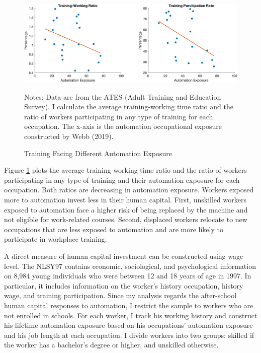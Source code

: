\documentclass[12pt]{article}
\begin{document}
\begin{figure}[h!]
\includegraphics[width = \textwidth]{train}
\caption{Training Facing Different Automation Exposure}
{\scriptsize Notes: Data are from the ATES (Adult Training and Education Survey). I calculate the average training-working time ratio and the ratio of workers participating in any type of training for each occupation. The x-axis is the automation occupational exposure constructed by Webb (2019).}
\label{train}
\end{figure}

Figure \ref{train} plots the average training-working time ratio and the ratio of workers participating in any type of training and their automation exposure for each occupation. Both ratios are decreasing in automation exposure. Workers exposed more to automation invest less in their human capital. First, unskilled workers exposed to automation face a higher risk of being replaced by the machine and not eligible for work-related courses. Second, displaced workers relocate to new occupations that are less exposed to automation and are more likely to participate in workplace training. 

A direct measure of human capital investment can be constructed using wage level. The NLSY97 contains economic, sociological, and psychological information on 8,984 young individuals who were between 12 and 18 years of age in 1997. In particular, it includes information on the worker's history occupation, history wage, and training participation. Since my analysis regards the after-school human capital responses to automation, I restrict the sample to workers who are not enrolled in schools. For each worker, I track his working history and construct his lifetime automation exposure based on his occupations' automation exposure and his job length at each occupation. I divide workers into two groups: skilled if the worker has a bachelor's degree or higher, and unskilled otherwise. 
\end{document}
